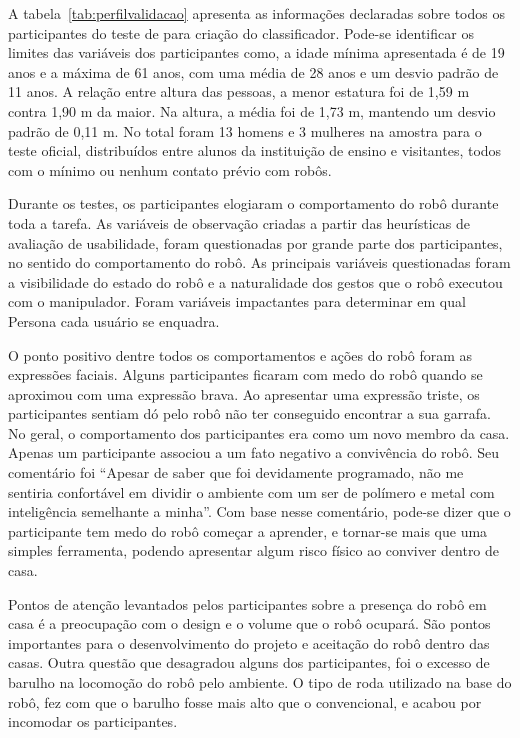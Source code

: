 A tabela~\ref{tab:perfilvalidacao} apresenta as informações declaradas sobre todos os participantes do teste de para criação do classificador. Pode-se identificar os limites das variáveis dos participantes como, a idade mínima apresentada é de 19 anos e a máxima de 61 anos, com uma média de 28 anos e um desvio padrão de 11 anos. A relação entre altura das pessoas, a menor estatura foi de 1,59 m contra 1,90 m da maior. Na altura, a média foi de 1,73 m, mantendo um desvio padrão de 0,11 m. No total foram 13 homens e 3 mulheres na amostra para o teste oficial, distribuídos entre alunos da instituição de ensino e visitantes, todos com o mínimo ou nenhum contato prévio com robôs.

Durante os testes, os participantes elogiaram o comportamento do robô durante toda a tarefa. As variáveis de observação criadas a partir das heurísticas de avaliação de usabilidade, foram questionadas por grande parte dos participantes, no sentido do comportamento do robô. As principais variáveis questionadas foram a visibilidade do estado do robô e a naturalidade dos gestos que o robô executou com o manipulador. Foram variáveis impactantes para determinar em qual Persona cada usuário se enquadra.

O ponto positivo dentre todos os comportamentos e ações do robô foram as expressões faciais. Alguns participantes ficaram com medo do robô quando se aproximou com uma expressão brava. Ao apresentar uma expressão triste, os participantes sentiam dó pelo robô não ter conseguido encontrar a sua garrafa. No geral, o comportamento dos participantes era como um novo membro da casa. Apenas um participante associou a um fato negativo a convivência do robô. Seu comentário foi ``Apesar de saber que foi devidamente programado, não me sentiria confortável em dividir o ambiente com um ser de polímero e metal com inteligência semelhante a minha''. Com base nesse comentário, pode-se dizer que o participante tem medo do robô começar a aprender, e tornar-se mais que uma simples ferramenta, podendo apresentar algum risco físico ao conviver dentro de casa.

Pontos de atenção levantados pelos participantes sobre a presença do robô em casa é a preocupação com o design e o volume que o robô ocupará. São pontos importantes para o desenvolvimento do projeto e aceitação do robô dentro das casas. Outra questão que desagradou alguns dos participantes, foi o excesso de barulho na locomoção do robô pelo ambiente. O tipo de roda utilizado na base do robô, fez com que o barulho fosse mais alto que o convencional, e acabou por incomodar os participantes. 


